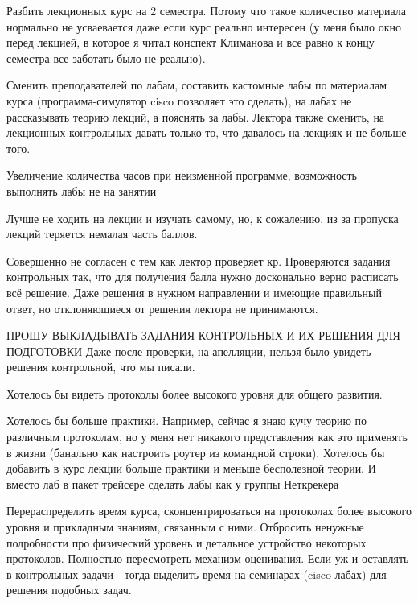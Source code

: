         \begin{commentbox}
			Разбить лекционных курс на 2 семестра. Потому что такое количество материала нормально не усваевается даже если курс реально интересен (у меня было окно перед лекцией, в которое я читал конспект Климанова и все равно к концу семестра все заботать было не реально).
		\end{commentbox}

        \begin{commentbox}
			Сменить преподавателей по лабам, составить кастомные лабы по материалам курса (программа-симулятор cisco позволяет это сделать), на лабах не рассказывать теорию лекций, а пояснять за лабы. Лектора также сменить, на лекционных контрольных давать только то, что давалось на лекциях и не больше того.
		\end{commentbox}

        \begin{commentbox}
            Увеличение количества часов при неизменной программе, возможность выполнять лабы не на занятии
        \end{commentbox}

        \begin{commentbox}
            Лучше не ходить на лекции и изучать самому, но, к сожалению, из за пропуска лекций теряется немалая часть баллов. 

            Совершенно не согласен с тем как лектор проверяет кр.
            Проверяются задания контрольных так, что для получения балла нужно досконально верно расписать всё решение. Даже решения в нужном направлении и имеющие правильный ответ, но отклоняющиеся от решения лектора не принимаются. 

            ПРОШУ ВЫКЛАДЫВАТЬ ЗАДАНИЯ КОНТРОЛЬНЫХ И ИХ РЕШЕНИЯ ДЛЯ ПОДГОТОВКИ
            Даже после проверки, на апелляции, нельзя было увидеть решения контрольной, что мы писали.
        \end{commentbox}

        \begin{commentbox}
            Хотелось бы видеть протоколы более высокого уровня для общего развития.
        \end{commentbox}

        \begin{commentbox}
            Хотелось бы больше практики. Например, сейчас я знаю кучу теорию по различным протоколам, но у меня нет никакого представления как это применять в жизни (банально как настроить роутер из командной строки). Хотелось бы добавить в курс лекции больше практики и меньше бесполезной теории. И вместо лаб в пакет трейсере сделать лабы как у группы Неткрекера
        \end{commentbox}    

        \begin{commentbox}
            Перераспределить время курса, сконцентрироваться на протоколах более высокого уровня и прикладным знаниям, связанным с ними. Отбросить ненужные подробности про физический уровень и детальное устройство некоторых протоколов. Полностью пересмотреть механизм оценивания. Если уж и оставлять в контрольных задачи - тогда выделить время на семинарах (cisco-лабах) для решения подобных задач.
        \end{commentbox}
